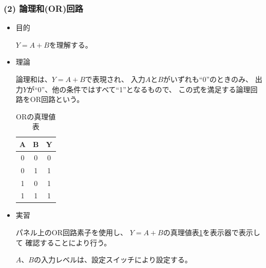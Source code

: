 \documentclass[12pt]{jarticle}
\begin{document}
\subsubsection*{(2) 論理和(OR)回路}
\begin{itemize}
    \item 目的

          $Y = A + B$を理解する。

    \item 理論

          論理和は、$Y= A + B$で表現され、
          入力$A$と$B$がいずれも``0''のときのみ、
          出力$Y$が``0''、他の条件ではすべて``1''となるもので、
          この式を満足する論理回路をOR回路という。

          \begin{table}[h]
              \caption{ORの真理値表}
              \begin{center}
                  \begin{tabular}{|c|c|c|}
                      \hline
                      A & B & Y \\
                      \hline
                      0 & 0 & 0 \\
                      \hline
                      0 & 1 & 1 \\
                      \hline
                      1 & 0 & 1 \\
                      \hline
                      1 & 1 & 1 \\
                      \hline
                  \end{tabular}
              \end{center}
              \label{table2}
          \end{table}

    \item 実習

          パネル上のOR回路素子を使用し、
          $Y = A + B$の真理値表\ref{table2}を表示器で表示して
          確認することにより行う。

          $A$、$B$の入力レベルは、設定スイッチにより設定する。
\end{itemize}
\end{document}

